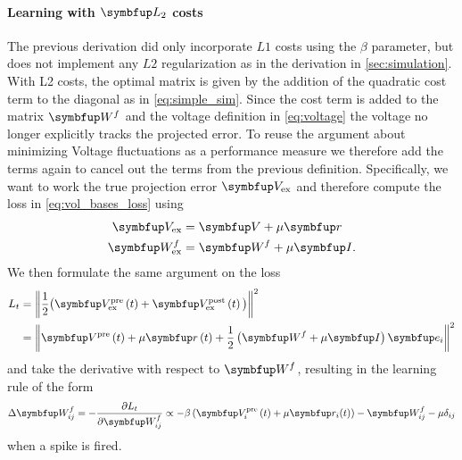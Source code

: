 \paragraph{Learning with $\bmu{L_2}$ costs}
The previous derivation did only incorporate $L1$ costs using the $\beta$ parameter, but does not implement any $L2$ regularization as in the derivation in \cref{sec:simulation}. With L2 costs, the optimal matrix is given by the addition of the quadratic cost term to the diagonal as in \cref{eq:simple_sim}. Since the cost term is added to the matrix $\bmu{W}^f$ and the voltage definition in \cref{eq:voltage} the voltage no longer explicitly tracks the projected error. To reuse the argument about minimizing Voltage fluctuations as a performance measure we therefore add the terms again to cancel out the terms from the previous definition. Specifically, we want to work the true projection error $\bmu{V}_{\text{ex}}$ and therefore compute the loss in \cref{eq:vol_bases_loss} using
\begin{equation}
\begin{aligned}
	\bmu{V}_{\text{ex}} &= \bmu{V} + \mu\bmu{r}\\
	\bmu{W}^f_{\text{ex}} & = \bmu{W}^f + \mu\bmu{I}.
\end{aligned}
\end{equation}
We then formulate the same argument on the loss
\begin{equation}\label{eq:vol_bases_loss}
\begin{aligned}
L_t & =\left\|\frac{1}{2}\big(\bmu{V}^{\text {pre}}_{\text{ex}}\left(t\right)+\bmu{V}^{\text {post}}_\text{ex}\left(t\right)\big)\right\|^2 \\
& =\left\|\bmu{V}^{\text {pre}}\left(t\right)+ \mu\bmu{r}\left(t\right) + \frac{1}{2}\left(\bmu{W}^f + \mu \bmu{I}\right)\bmu{e}_{i}\right\|^2
\end{aligned}
\end{equation}
and take the derivative with respect to $\bmu{W}^f$, resulting in the learning rule of the form
\begin{equation}
\Delta \bmu{W}^f_{ij} =-\frac{\partial L_t}{\partial \bmu{W}^f_{ij}} \propto - \beta\left( \bmu{V}_i^{\text {pre}}\left(t\right) + \mu \bmu{r}_i(t)\right) -\bmu{W}^f_{ij} -\mu\delta_{ij}
\end{equation}
when a spike is fired.


